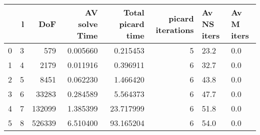 \begin{tabular}{lrrrrrll}
\toprule
{} &  l &     DoF &  AV solve Time &  Total picard time &  picard iterations & Av NS iters & Av M iters \\
\midrule
0 &  3 &     579 &       0.005660 &           0.215453 &                  5 &        23.2 &        0.0 \\
1 &  4 &    2179 &       0.011916 &           0.396911 &                  6 &        32.7 &        0.0 \\
2 &  5 &    8451 &       0.062230 &           1.466420 &                  6 &        43.8 &        0.0 \\
3 &  6 &   33283 &       0.284589 &           5.564373 &                  6 &        47.7 &        0.0 \\
4 &  7 &  132099 &       1.385399 &          23.717999 &                  6 &        51.8 &        0.0 \\
5 &  8 &  526339 &       6.510400 &          93.165204 &                  6 &        54.0 &        0.0 \\
\bottomrule
\end{tabular}
